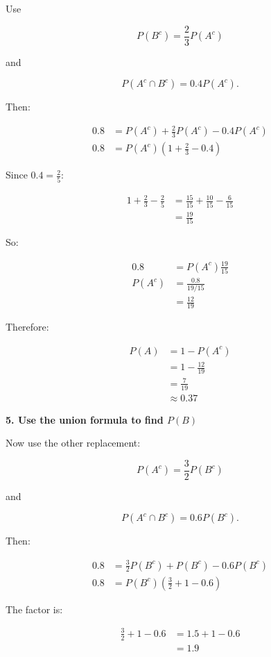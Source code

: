 \documentclass[10pt]{article}
\begin{document}
Use

\[
P(B^c)=\frac{2}{3}P(A^c)
\]

and

\[
P(A^c\cap B^c)=0.4P(A^c).
\]

Then:

\begin{align*}
0.8
&=
P(A^c)
+\frac{2}{3}P(A^c)
-0.4P(A^c) \\[2mm]
0.8
&=
P(A^c)
\left(
1+\frac{2}{3}-0.4
\right)
\end{align*}

Since $0.4=\frac{2}{5}$:

\begin{align*}
1+\frac{2}{3}-\frac{2}{5}
&=
\frac{15}{15}
+\frac{10}{15}
-\frac{6}{15} \\[2mm]
&=
\frac{19}{15}
\end{align*}

So:

\begin{align*}
0.8
&=
P(A^c)\frac{19}{15} \\[2mm]
P(A^c)
&=
\frac{0.8}{19/15} \\[2mm]
&=
\frac{12}{19}
\end{align*}

Therefore:

\begin{align*}
P(A)
&=
1-P(A^c) \\[2mm]
&=
1-\frac{12}{19} \\[2mm]
&=
\frac{7}{19} \\[2mm]
&\approx 0.37
\end{align*}

\textbf{5. Use the union formula to find $P(B)$}

Now use the other replacement:

\[
P(A^c)=\frac{3}{2}P(B^c)
\]

and

\[
P(A^c\cap B^c)=0.6P(B^c).
\]

Then:

\begin{align*}
0.8
&=
\frac{3}{2}P(B^c)
+P(B^c)
-0.6P(B^c) \\[2mm]
0.8
&=
P(B^c)
\left(
\frac{3}{2}+1-0.6
\right)
\end{align*}

The factor is:

\begin{align*}
\frac{3}{2}+1-0.6
&=
1.5+1-0.6 \\[2mm]
&=1.9
\end{align*}
\end{document}
